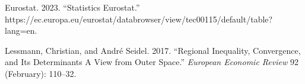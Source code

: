 \documentclass[
  letterpaper,
  DIV=11,
  numbers=noendperiod]{scrartcl}
\newlength{\cslhangindent}
\newlength{\cslentryspacingunit} %
\newenvironment{CSLReferences}[2] %
 {%
  \setlength{\parindent}{0pt}
  \ifodd #1
  \let\oldpar\par
  \def\par{\hangindent=\cslhangindent\oldpar}
  \fi
  \setlength{\parskip}{#2\cslentryspacingunit}
 }%
 {}
\begin{document}
\hypertarget{refs}{}
\begin{CSLReferences}{1}{0}
\leavevmode{}%
Eurostat. 2023. {``Statistics \textbar{} {Eurostat}.''}
https://ec.europa.eu/eurostat/databrowser/view/tec00115/default/table?lang=en.

\leavevmode{}%
Lessmann, Christian, and André Seidel. 2017. {``Regional Inequality,
Convergence, and Its Determinants \textendash{} {A} View from Outer
Space.''} \emph{European Economic Review} 92 (February): 110--32.

\end{CSLReferences}
\end{document}
